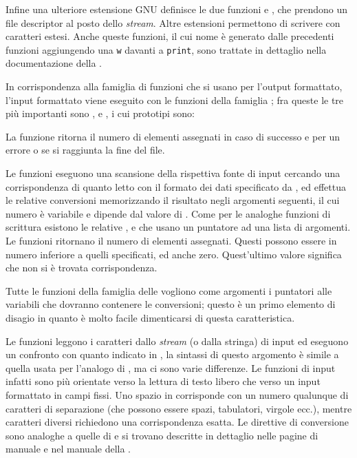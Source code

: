 
Infine una ulteriore estensione GNU definisce le due funzioni  e
, che prendono un file descriptor al posto dello
\textit{stream}. Altre estensioni permettono di scrivere con caratteri
estesi. Anche queste funzioni, il cui nome è generato dalle precedenti
funzioni aggiungendo una \texttt{w} davanti a \texttt{print}, sono trattate in
dettaglio nella documentazione della .

In corrispondenza alla famiglia di funzioni  che si usano per
l'output formattato, l'input formattato viene eseguito con le funzioni della
famiglia ; fra queste le tre più importanti sono ,
 e , i cui prototipi sono:

\begin{funcproto}{
}

{La funzione ritorna il numero di elementi assegnati in caso di successo e
   per un errore o se si raggiunta la fine del file.}
\end{funcproto}

Le funzioni eseguono una scansione della rispettiva fonte di input cercando
una corrispondenza di quanto letto con il formato dei dati specificato
da , ed effettua le relative conversioni memorizzando il
risultato negli argomenti seguenti, il cui numero è variabile e dipende dal
valore di . Come per le analoghe funzioni di scrittura esistono
le relative ,  e  che usano un
puntatore ad una lista di argomenti. Le funzioni ritornano il numero di
elementi assegnati. Questi possono essere in numero inferiore a quelli
specificati, ed anche zero. Quest'ultimo valore significa che non si è trovata
corrispondenza.

Tutte le funzioni della famiglia delle  vogliono come argomenti i
puntatori alle variabili che dovranno contenere le conversioni; questo è un
primo elemento di disagio in quanto è molto facile dimenticarsi di questa
caratteristica.

Le funzioni leggono i caratteri dallo \textit{stream} (o dalla stringa) di
input ed eseguono un confronto con quanto indicato in , la
sintassi di questo argomento è simile a quella usata per l'analogo di
, ma ci sono varie differenze.  Le funzioni di input infatti sono
più orientate verso la lettura di testo libero che verso un input formattato
in campi fissi. Uno spazio in  corrisponde con un numero
qualunque di caratteri di separazione (che possono essere spazi, tabulatori,
virgole ecc.), mentre caratteri diversi richiedono una corrispondenza
esatta. Le direttive di conversione sono analoghe a quelle di  e
si trovano descritte in dettaglio nelle pagine di manuale e nel manuale della
.

